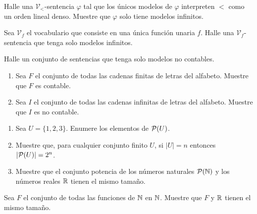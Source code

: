 \message{ !name(main.tex)}\documentclass[12pt,a4paper]{book}
\newcommand{\VV}{\mathcal{V}}
\begin{document}
    \begin{ejercicio}
        Halle una $\VV_{<}$-sentencia $\varphi$ tal que los únicos modelos de $\varphi$ interpreten $<$ como un orden
        lineal denso. Muestre que $\varphi$ solo tiene modelos infinitos.
    \end{ejercicio}

    \begin{ejercicio}
        Sea $\VV_{f}$ el vocabulario que consiste en una única función unaria $f$. Halle una $\VV_{f}$-sentencia que
        tenga solo modelos infinitos.
    \end{ejercicio}

    \begin{ejercicio}
        Halle un conjunto de sentencias que tenga solo modelos no contables.
    \end{ejercicio}

    \begin{ejercicio}
        \begin{enumerate}[label=(\alph*)]
            \item Sea $F$ el conjunto de todas las cadenas finitas de letras del alfabeto. Muestre que $F$ es contable.
            \item Sea $I$ el conjunto de todas las cadenas infinitas de letras del alfabeto. Muestre que $I$ es no
            contable.
        \end{enumerate}
    \end{ejercicio}

    \begin{ejercicio}
        \begin{enumerate}[label=(\alph*)]
            \item Sea $U=\{1,2,3\}$. Enumere los elementos de $\mathcal{P}(U)$.
            \item Muestre que, para cualquier conjunto finito $U$, si $|U|=n$ entonces $|\mathcal{P}(U)|=2^{n}$.
            \item Muestre que el conjunto potencia de los números naturales $\mathcal{P}(\mathbb{N})$ y los números reales $\mathbb{R}$ tienen el
            mismo tamaño.
        \end{enumerate}
    \end{ejercicio}

    \begin{ejercicio}
        Sea $F$ el conjunto de todas las funciones de $\mathbb{N}$ en $\mathbb{N}$. Muestre que $F$ y $\mathbb{R}$ tienen el mismo tamaño.
    \end{ejercicio}
\end{document}
